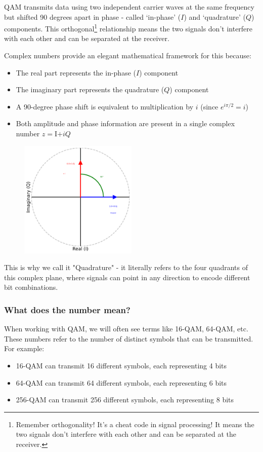 QAM transmits data using two independent carrier waves at the same frequency but shifted 90 degrees apart in phase - called `in-phase' ($I$) and `quadrature' ($Q$) components. This orthogonal\footnote{
    Remember orthogonality! It's a cheat code in signal processing! It means the two signals don't interfere with each other and can be separated at the receiver.
} relationship means the two signals don't interfere with each other and can be separated at the receiver.

Complex numbers provide an elegant mathematical framework for this because:
\begin{itemize}
    \item The real part represents the in-phase ($I$) component
    \item The imaginary part represents the quadrature ($Q$) component  
    \item A 90-degree phase shift is equivalent to multiplication by $i$ (since $e^{i\pi/2} = i$)
    \item Both amplitude and phase information are present in a single complex number $z = $I$ + iQ$
\end{itemize}

\begin{figure}[h]
    \centering
    \includegraphics[width=0.5\textwidth]{assets/diagrams/iq.png}
\end{figure}

This is why we call it "Quadrature" - it literally refers to the four quadrants of this complex plane, where signals can point in any direction to encode different bit combinations.

\subsubsection{What does the number mean?}
When working with QAM, we will often see terms like 16-QAM, 64-QAM, etc. These numbers refer to the number of distinct symbols that can be transmitted. For example:
\begin{itemize}
    \item 16-QAM can transmit 16 different symbols, each representing 4 bits
    \item 64-QAM can transmit 64 different symbols, each representing 6 bits
    \item 256-QAM can transmit 256 different symbols, each representing 8 bits
\end{itemize}

